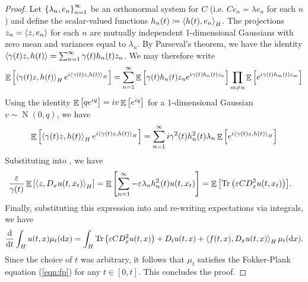 \begin{proof}
  Let \(\qty{\lambda_{n}, e_{n}}_{n=1}^{\infty}\) be an orthonormal system for \(C\) (i.e. \(C e_{n} = \lambda e_{n}\) for each \(n\)) and define the scalar-valued functions \(h_{n}(t) \coloneqq \ev{h(t), e_{n}}_{H}\). The projections \(z_{n} = \ev{z, e_{n}}\) for each \(n\) are mutually independent 1-dimensional Gaussians with zero mean and variances equal to \(\lambda_{n}\).  By Parseval's theorem, we have the identity \(\ev{\gamma(t) z, h(t)} = \sum_{n=1}^{\infty} \gamma(t) h_{n}(t) z_{n} \). We may therefore write
  \[
    \mathop{\mathbb{E}}\qty[\ev{\gamma(t) z, h(t)}_{H} e^{i \ev{\gamma(t)z, h(t)}_{H}}] = \sum_{n=1}^{\infty} \mathop{\mathbb{E}}\qty[\gamma(t) h_{n}(t) z_{n} e^{i \gamma(t) h_{n}(t) z_{n}}] \prod\limits_{m \neq n} \mathop{\mathbb{E}}\qty[e^{i \gamma(t) h_{m}(t) z_{m}}]
  \]
  Using the identity \(\mathop{\mathbb{E}}\qty[q e^{i q}] = i v \mathop{\mathbb{E}}\qty[e^{i q}]\) for a 1-dimensional Gaussian \(v \sim \operatorname{N}(0, q)\), we have
  \begin{align*}
    \mathop{\mathbb{E}}\qty[\ev{\gamma(t) z, h(t)}_{H} e^{i \ev{\gamma(t)z, h(t)}_{H}}] = \sum_{n=1}^{\infty} i \gamma^{2}(t)h_{n}^{2}(t)\lambda_{n} \mathop{\mathbb{E}}\qty[e^{i \ev{\gamma(t) z, h(t)}_{H}}]
  \end{align*}
  Substituting into , we have
  \begin{align*}
    \frac{\varepsilon}{\gamma(t)} \mathop{\mathbb{E}}\qty[\ev{z, D_{x} u(t, x_{t})}_{H}] &= \mathop{\mathbb{E}}\qty[\sum_{n=1}^{\infty} - \varepsilon \lambda_{n} h_{n}^{2}(t) u(t, x_{t})] = \mathop{\mathbb{E}}\qty[\operatorname{Tr}\qty(\varepsilon C D^{2}_{x}u(t, x_{t}))].
  \end{align*}
  Finally, substituting this expression into  and re-writing expectations via integrals, we have
  \[
    \dv{t} \int_{H} u(t, x) \mu_{t}(\dd{x}) = \int_{H} \operatorname{Tr}\qty(\varepsilon C D^{2}_{x} u(t, x)) + D_{t}u(t, x) + \ev{f(t, x), D_{x}u(t, x)}_{H} \mu_{t}(\dd{x}).
  \]
  Since the choice of \(t\) was arbitrary, it follows that \(\mu_{t}\) satisfies the Fokker-Plank equation (\ref{eqn:fp}) for any \(t \in [0, t]\). This concludes the proof.
\end{proof}

